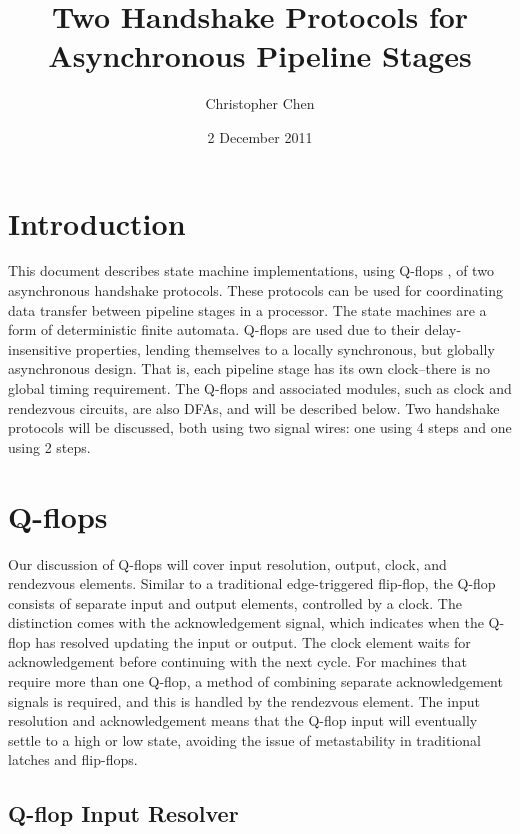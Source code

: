 \documentclass[10pt]{article}
\begin{document}
\title{Two Handshake Protocols for Asynchronous Pipeline Stages}
\author{Christopher Chen}
\date{2 December 2011}
\maketitle

\section{Introduction}

This document describes state machine implementations, using Q-flops \cite{rosenberger}, of two asynchronous handshake protocols. These protocols can be used for coordinating data transfer between pipeline stages in a processor. The state machines are a form of deterministic finite automata. Q-flops are used due to their delay-insensitive properties, lending themselves to a locally synchronous, but globally asynchronous design. That is, each pipeline stage has its own clock--there is no global timing requirement. The Q-flops and associated modules, such as clock and rendezvous circuits, are also DFAs, and will be described below. Two handshake protocols will be discussed, both using two signal wires: one using 4 steps and one using 2 steps.

\section{Q-flops}

Our discussion of Q-flops will cover input resolution, output, clock, and rendezvous elements. Similar to a traditional edge-triggered flip-flop, the Q-flop consists of separate input and output elements, controlled by a clock. The distinction comes with the acknowledgement signal, which indicates when the Q-flop has resolved updating the input or output. The clock element waits for acknowledgement before continuing with the next cycle. For machines that require more than one Q-flop, a method of combining separate acknowledgement signals is required, and this is handled by the rendezvous element. The input resolution and acknowledgement means that the Q-flop input will eventually settle to a high or low state, avoiding the issue of metastability in traditional latches and flip-flops.

\subsection{Q-flop Input Resolver}
\end{document}
